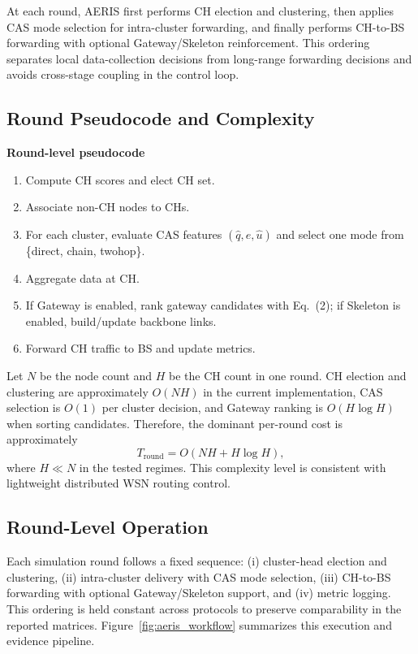 ﻿\documentclass[sensors,article,submit,moreauthors,pdftex]{Definitions/mdpi}
\begin{document}
At each round, AERIS first performs CH election and clustering, then applies CAS mode selection for intra-cluster forwarding, and finally performs CH-to-BS forwarding with optional Gateway/Skeleton reinforcement. This ordering separates local data-collection decisions from long-range forwarding decisions and avoids cross-stage coupling in the control loop.

\subsection{Round Pseudocode and Complexity}
\textbf{Round-level pseudocode}
\begin{enumerate}
\item Compute CH scores and elect CH set.
\item Associate non-CH nodes to CHs.
\item For each cluster, evaluate CAS features $(\hat{q},\hat{e},\hat{u})$ and select one mode from \{direct, chain, twohop\}.
\item Aggregate data at CH.
\item If Gateway is enabled, rank gateway candidates with Eq.~(2); if Skeleton is enabled, build/update backbone links.
\item Forward CH traffic to BS and update metrics.
\end{enumerate}

Let $N$ be the node count and $H$ be the CH count in one round. CH election and clustering are approximately $O(NH)$ in the current implementation, CAS selection is $O(1)$ per cluster decision, and Gateway ranking is $O(H\log H)$ when sorting candidates. Therefore, the dominant per-round cost is approximately
\begin{equation}
T_{\mathrm{round}} = O(NH + H\log H),
\end{equation}
where $H \ll N$ in the tested regimes. This complexity level is consistent with lightweight distributed WSN routing control.

\subsection{Round-Level Operation}
Each simulation round follows a fixed sequence: (i) cluster-head election and clustering, (ii) intra-cluster delivery with CAS mode selection, (iii) CH-to-BS forwarding with optional Gateway/Skeleton support, and (iv) metric logging. This ordering is held constant across protocols to preserve comparability in the reported matrices. Figure~\ref{fig:aeris_workflow} summarizes this execution and evidence pipeline.
\end{document}

